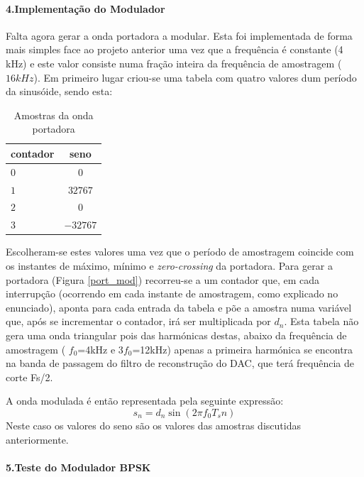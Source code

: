 \documentclass[11pt]{article}
\numberwithin{equation}{section}
\begin{document}
	\paragraph{4.Implementação do Modulador} \hspace{0pt}
	\label{para:P2-4}
	
	Falta agora gerar a onda portadora a modular. Esta foi implementada de forma mais simples face ao projeto anterior uma vez que a frequência é constante (4 kHz) e este valor consiste numa fração inteira da frequência de amostragem ($16 kHz$).
	Em primeiro lugar criou-se uma tabela com quatro valores dum período da sinusóide, sendo esta:
	\begin{table}[H]
		\centering
		\caption{Amostras da onda portadora}
		\label{tab:amostras}
		\begin{tabular}[c]{|l||c|}
			\hline \textbf{contador} & \textbf{seno}\\ 
			\hline $ 0 $ & $ 0 $\\ 
			\hline $ 1 $ & $ 32767 $  \\ 
			\hline $ 2 $ & $ 0 $ \\ 
			\hline $ 3 $ & $ -32767 $ \\
			\hline
		\end{tabular}
	\end{table}
	
	Escolheram-se estes valores uma vez que o período de amostragem coincide com os instantes de máximo, mínimo e \textit{zero-crossing} da portadora. Para gerar a portadora (Figura \ref{port_mod}) recorreu-se a um contador que, em cada interrupção (ocorrendo em cada instante de amostragem, como explicado no enunciado), aponta para cada entrada da tabela e põe a amostra numa variável que, após se incrementar o contador, irá ser multiplicada por $d_n$. Esta tabela não gera uma onda triangular pois das harmónicas destas, abaixo da frequência de amostragem ( $f_0$=4kHz e 3$f_0$=12kHz) apenas a primeira harmónica se encontra na banda de passagem do filtro de reconstrução do DAC, que terá frequência de corte Fs/2.
	
	A onda modulada é então representada pela seguinte expressão:
	\begin{equation}
	s_n= d_n \sin(2 \pi f_0T_sn) 
	\end{equation}
	Neste caso os valores do seno são os valores das amostras discutidas anteriormente.
	\vspace{2 mm}
	
	\paragraph{5.Teste do Modulador BPSK} \hspace{0pt}
	\label{para:P2-5}
	
\end{document}
